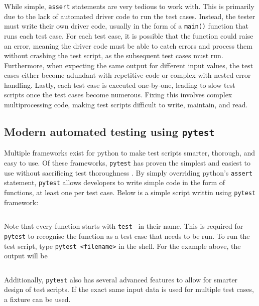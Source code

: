 \documentclass[11pt]{article}
\begin{document}
While simple, \texttt{assert} statements are very tedious to work with. This is primarily due to the lack of automated driver code to run the test cases. Instead, the tester must write their own driver code, usually in the form of a \texttt{main()} function that runs each test case. For each test case, it is possible that the function could raise an error, meaning the driver code must be able to catch errors and process them without crashing the test script, as the subsequent test cases must run. Furthermore, when expecting the same output for different input values, the test cases either become adundant with repetitive code or complex with nested error handling. Lastly, each test case is executed one-by-one, leading to slow test scripts once the test cases become numerous. Fixing this involves complex multiprocessing code, making test scripts difficult to write, maintain, and read.

\subsection{Modern automated testing using \texttt{pytest}}

Multiple \glspl{framework} exist for \Gls{python} to make test scripts smarter, thorough, and easy to use. Of these \glspl{framework}, \texttt{pytest} has proven the simplest and easiest to use without sacrificing test thoroughness \cite{pytest}. By simply overriding \Gls{python}'s \texttt{assert} statement, \texttt{pytest} allows developers to write simple code in the form of functions, at least one per test case. Below is a simple script writtin using \texttt{pytest} \gls{framework}:

\inputminted{python}{python_examples/pytest_simple.py}

\noindent
Note that every function starts with \texttt{test_} in their name. This is required for \texttt{pytest} to recognise the function as a test case that needs to be run. To run the test script, type \texttt{pytest <filename>} in the shell. For the example above, the output will be 

\inputminted[linenos=false, frame=none]{shell}{python_examples/pytest_simple_output.txt}

Additionally, \texttt{pytest} also has several advanced features to allow for smarter design of test scripts. If the exact same input data is used for multiple test cases, a fixture can be used.
\end{document}
